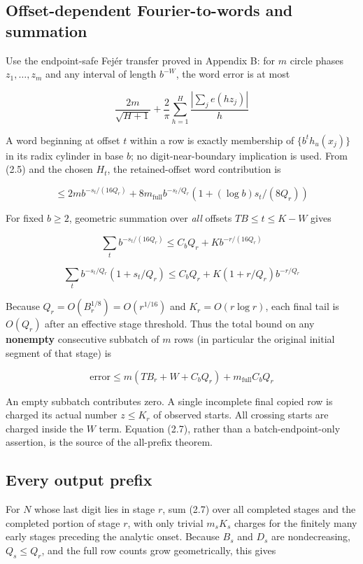 \documentclass[11pt,a4paper]{article}
\begin{document}
\subsection{Offset-dependent Fourier-to-words and
summation}\label{offset-dependent-fourier-to-words-and-summation}

Use the endpoint-safe Fejér transfer proved in Appendix B: for \(m\)
circle phases \(z_1,\ldots,z_m\) and any interval of length \(b^{-W}\),
the word error is at most

\[
\frac{2m}{\sqrt{H+1}}+\frac2\pi\sum_{h=1}^H\frac{\left|\sum_j e(hz_j)\right|}{h}
\]

A word beginning at offset \(t\) within a row is exactly membership of
\(\lbrace b^t h_u(x_j)\rbrace\) in its radix cylinder in base \(b\); no
digit-near-boundary implication is used. From (2.5) and the chosen
\(H_t\), the retained-offset word contribution is

\[
\le  2m b^{-s_t/(16 Q_r)} + 8 m_{\mathrm{full}} b^{-s_t/Q_r}(1+(\log b)s_t/(8Q_r)) \tag{2.6}
\]

For fixed \(b\ge 2\), geometric summation over \emph{all} offsets
\(TB\le t\le K-W\) gives

\[
\sum_t b^{-s_t/(16Q_r)} \le  C_b Q_r + K b^{-r/(16Q_r)}
\]

\[
\sum_t b^{-s_t/Q_r}(1+s_t/Q_r) \le  C_b Q_r + K(1+r/Q_r)b^{-r/Q_r}
\]

Because \(Q_r=O(B_r^{1/8})=O(r^{1/16})\) and \(K_r=O(r \log r)\), each
final tail is \(O(Q_r)\) after an effective stage threshold. Thus the
total bound on any \textbf{nonempty} consecutive subbatch of \(m\) rows
(in particular the original initial segment of that stage) is

\[
\text{error}\le m(TB_r+W+C_bQ_r)+m_{\mathrm{full}}C_bQ_r \tag{2.7}
\]

An empty subbatch contributes zero. A single incomplete final copied row
is charged its actual number \(z\le K_r\) of observed starts. All
crossing starts are charged inside the \(W\) term. Equation (2.7),
rather than a batch-endpoint-only assertion, is the source of the
all-prefix theorem.

\subsection{Every output prefix}\label{every-output-prefix}

For \(N\) whose last digit lies in stage \(r\), sum (2.7) over all
completed stages and the completed portion of stage \(r\), with only
trivial \(m_s K_s\) charges for the finitely many early stages preceding
the analytic onset. Because \(B_s\) and \(D_s\) are nondecreasing,
\(Q_s\le Q_r\), and the full row counts grow geometrically, this gives
\end{document}
